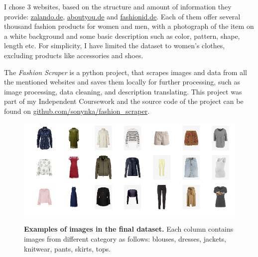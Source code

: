 \documentclass[12pt]{report}
\begin{document}
I chose 3 websites, based on the structure and amount of information they provide: \href{https://www.zalando.de/damen-home/}{zalando.de}, \href{https://www.aboutyou.de/}{aboutyou.de} and \href{https://www.fashionid.de/damen/}{fashionid.de}. Each of them offer several thousand fashion products for women and men, with a photograph of the item on a white background and some basic description such as color, pattern, shape, length etc. For simplicity, I have limited the dataset to women's clothes, excluding products like accessories and shoes.

The \textit{Fashion Scraper} is a python project, that scrapes images and data from all the mentioned websites and saves them locally for further processing, such as image processing, data cleaning, and description translating. This project was part of my Independent Coursework and the source code of the project can be found on \href{https://github.com/sonynka/fashion_scraper}{github.com/sonynka/fashion\_scraper}.

\begin{figure}[h]
\centering
{\includegraphics[width=\linewidth]{03_analysis/data/img_grid2}}
\caption{\label{fig:dataset} \textbf{Examples of images in the final dataset.} Each column contains images from different category as follows: blouses, dresses, jackets, knitwear, pants, skirts, tops.}
\end{figure}
\end{document}
